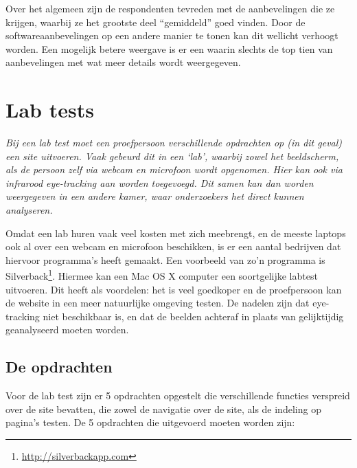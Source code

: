 \documentclass[a4paper, 10pt, pdftex]{report}
\begin{document}
    Over het algemeen zijn de respondenten tevreden met de aanbevelingen die ze krijgen, waarbij ze het grootste deel ``gemiddeld'' goed vinden. Door de softwareaanbevelingen op een andere manier te tonen kan dit wellicht verhoogt worden. Een mogelijk betere weergave is er een waarin slechts de top tien van aanbevelingen met wat meer details wordt weergegeven.

    \newpage
    \section{Lab tests}
    \textit{Bij een lab test moet een proefpersoon verschillende opdrachten op (in dit geval) een site uitvoeren. Vaak gebeurd dit in een `lab', waarbij zowel het beeldscherm, als de persoon zelf via webcam en microfoon wordt opgenomen. Hier kan ook via infrarood eye-tracking aan worden toegevoegd. Dit samen kan dan worden weergegeven in een andere kamer, waar onderzoekers het direct kunnen analyseren.}

    Omdat een lab huren vaak veel kosten met zich meebrengt, en de meeste laptops ook al over een webcam en microfoon beschikken, is er een aantal bedrijven dat hiervoor programma's heeft gemaakt. Een voorbeeld van zo'n programma is Silverback\footnote{\url{http://silverbackapp.com}}. Hiermee kan een Mac OS X computer een soortgelijke labtest uitvoeren. Dit heeft als voordelen: het is veel goedkoper en de proefpersoon kan de website in een meer natuurlijke omgeving testen. De nadelen zijn dat eye-tracking niet beschikbaar is, en dat de beelden achteraf in plaats van gelijktijdig geanalyseerd moeten worden.

    \subsection{De opdrachten}
    Voor de lab test zijn er 5 opdrachten opgestelt die verschillende functies verspreid over de site bevatten, die zowel de navigatie over de site, als de indeling op pagina's testen. De 5 opdrachten die uitgevoerd moeten worden zijn:
\end{document}
